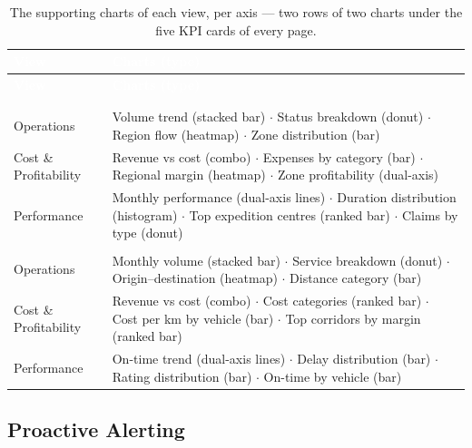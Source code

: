 \begingroup
\small
\renewcommand{\arraystretch}{1.3}
\begin{xltabular}{\linewidth}{|>{\raggedright\arraybackslash}p{3.0cm}|>{\raggedright\arraybackslash}X|}
\caption{The supporting charts of each view, per axis --- two rows of two charts under the five KPI cards
of every page.}
\label{tab:ch4-dash-charts} \\
\hline
{}
\textcolor{white}{\textbf{View}} & \textcolor{white}{\textbf{Charts (type)}} \\
\hline
\endfirsthead
\hline
{}
\textcolor{white}{\textbf{View}} & \textcolor{white}{\textbf{Charts (type)}} \\
\hline
\endhead
\hline
{} \\
\endfoot
\endlastfoot
{} \\
\hline
Operations & Volume trend (stacked bar) $\cdot$ Status breakdown (donut) $\cdot$ Region flow (heatmap)
$\cdot$ Zone distribution (bar) \\
Cost \& Profitability & Revenue vs cost (combo) $\cdot$ Expenses by category (bar) $\cdot$ Regional
margin (heatmap) $\cdot$ Zone profitability (dual-axis) \\
Performance & Monthly performance (dual-axis lines) $\cdot$ Duration distribution (histogram) $\cdot$
Top expedition centres (ranked bar) $\cdot$ Claims by type (donut) \\
\hline
{} \\
\hline
Operations & Monthly volume (stacked bar) $\cdot$ Service breakdown (donut) $\cdot$ Origin--destination
(heatmap) $\cdot$ Distance category (bar) \\
Cost \& Profitability & Revenue vs cost (combo) $\cdot$ Cost categories (ranked bar) $\cdot$ Cost per km
by vehicle (bar) $\cdot$ Top corridors by margin (ranked bar) \\
Performance & On-time trend (dual-axis lines) $\cdot$ Delay distribution (bar) $\cdot$ Rating
distribution (bar) $\cdot$ On-time by vehicle (bar) \\
\hline
\end{xltabular}
\endgroup

\subsection{Proactive Alerting}

